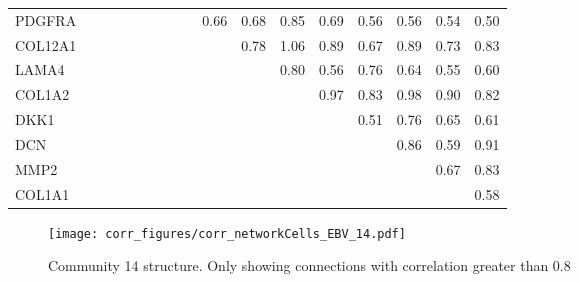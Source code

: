\begin{longtable}{lrrrrrrrrrrrrrrrr}
PDGFRA  &              &           &              &              &             &           &            &              &          0.66 &        0.68 &         0.85 &       0.69 &      0.56 &       0.56 &         0.54 &        0.50 \\
COL12A1 &              &           &              &              &             &           &            &              &               &        0.78 &         1.06 &       0.89 &      0.67 &       0.89 &         0.73 &        0.83 \\
LAMA4   &              &           &              &              &             &           &            &              &               &             &         0.80 &       0.56 &      0.76 &       0.64 &         0.55 &        0.60 \\
COL1A2  &              &           &              &              &             &           &            &              &               &             &              &       0.97 &      0.83 &       0.98 &         0.90 &        0.82 \\
DKK1    &              &           &              &              &             &           &            &              &               &             &              &            &      0.51 &       0.76 &         0.65 &        0.61 \\
DCN     &              &           &              &              &             &           &            &              &               &             &              &            &           &       0.86 &         0.59 &        0.91 \\
MMP2    &              &           &              &              &             &           &            &              &               &             &              &            &           &            &         0.67 &        0.83 \\
COL1A1  &              &           &              &              &             &           &            &              &               &             &              &            &           &            &              &        0.58 \\
\end{longtable}


\begin{figure}[h!]
\centering
\texttt{[image: corr\_figures/corr\_networkCells\_EBV\_14.pdf]}
\caption{Community 14 structure. Only showing connections with correlation greater than 0.8}
\end{figure}




